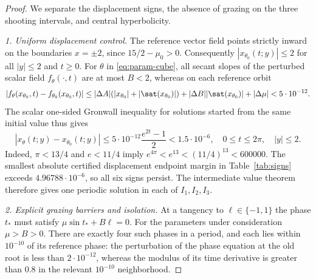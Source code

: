 \begin{proof}
We separate the displacement signs, the absence of grazing on
the three shooting intervals, and central hyperbolicity.

\emph{1. Uniform displacement control.}
The reference vector field points strictly inward on the
boundaries $x=\pm2$, since $15/2-\mu_0>0$.
Consequently $|x_{\theta_0}(t;y)|\le2$ for all
$|y|\le2$ and $t\ge0$.
For $\theta$ in \eqref{eq:param-cube}, all secant slopes
of the perturbed scalar field $f_\theta(\cdot,t)$ are
at most $B<2$, whereas on each reference orbit
\[
 |f_\theta(x_{\theta_0},t)-f_{\theta_0}(x_{\theta_0},t)|
 \le|\Delta A|(|x_{\theta_0}|+|\sat(x_{\theta_0})|)
 +|\Delta B||\sat(x_{\theta_0})|+|\Delta\mu|
 <5\cdot10^{-12}.
\]
The scalar one-sided Gronwall inequality for solutions
started from the same initial value thus gives
\begin{equation}\label{eq:uniform-parameter}
 |x_\theta(t;y)-x_{\theta_0}(t;y)|
 \le5\cdot10^{-12}\frac{e^{2t}-1}{2}
 <1.5\cdot10^{-6},\quad
 0\le t\le2\pi,\quad |y|\le2.
\end{equation}
Indeed, $\pi<13/4$ and $e<11/4$ imply
$e^{4\pi}<e^{13}<(11/4)^{13}<600000$.
The smallest absolute certified displacement endpoint
margin in Table~\ref{tab:signs} exceeds
$4.96788\cdot10^{-6}$, so all six signs persist.
The intermediate value theorem therefore gives one
periodic solution in each of $I_1,I_2,I_3$.

\emph{2. Explicit grazing barriers and isolation.}
At a tangency to $\ell\in\{-1,1\}$ the phase
$t_*$ must satisfy $\mu\sin t_*+B\ell=0$.
For the parameters under consideration $\mu>B>0$.
There are exactly four such phases in a period,
and each lies within $10^{-10}$ of its reference
phase: the perturbation of the phase equation
at the old root is less than $2\cdot10^{-12}$,
whereas the modulus of its time derivative
is greater than $0.8$ in the relevant
$10^{-10}$ neighborhood.


\end{proof}
